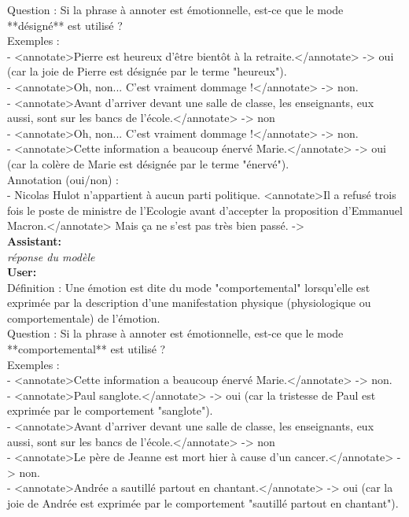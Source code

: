 {Question : Si la phrase à annoter est émotionnelle, est-ce que le mode **désigné** est utilisé ?\\

Exemples :\\
- <annotate>Pierre est heureux d'être bientôt à la retraite.</annotate> -> oui (car la joie de Pierre est désignée par le terme "heureux").\\
- <annotate>Oh, non... C'est vraiment dommage !</annotate> -> non.\\
- <annotate>Avant d'arriver devant une salle de classe, les enseignants, eux aussi, sont sur les bancs de l'école.</annotate> -> non\\
- <annotate>Oh, non... C'est vraiment dommage !</annotate> -> non.\\
- <annotate>Cette information a beaucoup énervé Marie.</annotate> -> oui (car la colère de Marie est désignée par le terme "énervé").\\

Annotation (oui/non) :\\
- Nicolas Hulot n’appartient à aucun parti politique. <annotate>Il a refusé trois fois le poste de ministre de l’Ecologie avant d’accepter la proposition d’Emmanuel Macron.</annotate> Mais ça ne s’est pas très bien passé.  -> \\

\textbf{Assistant:}\\
\textit{réponse du modèle}\\

\textbf{User:}\\
Définition : Une émotion est dite du mode "comportemental" lorsqu'elle est exprimée par la description d'une manifestation physique (physiologique ou comportementale) de l'émotion.\\

Question : Si la phrase à annoter est émotionnelle, est-ce que le mode **comportemental** est utilisé ?\\

Exemples :\\
- <annotate>Cette information a beaucoup énervé Marie.</annotate> -> non.\\
- <annotate>Paul sanglote.</annotate> -> oui (car la tristesse de Paul est exprimée par le comportement "sanglote").\\
- <annotate>Avant d'arriver devant une salle de classe, les enseignants, eux aussi, sont sur les bancs de l'école.</annotate> -> non\\
- <annotate>Le père de Jeanne est mort hier à cause d'un cancer.</annotate> -> non.\\
- <annotate>Andrée a sautillé partout en chantant.</annotate> -> oui (car la joie de Andrée est exprimée par le comportement "sautillé partout en chantant").\\

}
